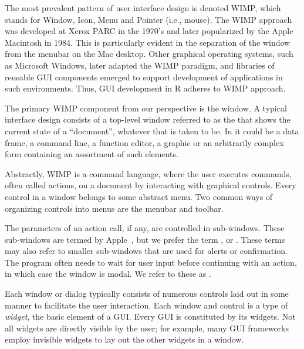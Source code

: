 


The most prevalent pattern of user interface design is denoted WIMP,
which stands for Window, Icon, Menu and Pointer (i.e., mouse). The
WIMP approach was developed at Xerox PARC in the 1970's and later
popularized by the Apple Macintosh in 1984. This is particularly
evident in the separation of the window from the menubar on the Mac
desktop. Other graphical operating systems, such as Microsoft Windows,
later adapted the WIMP paradigm, and libraries of reusable GUI
components emerged to support development of applications in such
environments. Thus, GUI development in R adheres to WIMP approach.

The primary WIMP component from our perspective is the window. A
typical interface design consists of a top-level window referred to as
the  that shows the current state of a
``document'', whatever that is taken to be. In \R\/ it could be a data
frame, a command line, a function editor, a graphic or an arbitrarily
complex form containing an assortment of such elements. 


Abstractly, WIMP is a command language, where the user executes
commands, often called actions, on a document by interacting with
graphical controls. Every control in a window belongs to some abstract
menu. Two common ways of organizing controls into menus are the
menubar and toolbar.

The parameters of an action call, if any, are controlled in
sub-windows. These sub-windows are termed 
by Apple~\citep{APPLE:HIG}, but we prefer the term ,
or . These terms may also refer to smaller
sub-windows that are used for alerts or confirmation. The program
often needs to wait for user input before continuing with an action,
in which case the window is modal. We refer to these as .

Each window or dialog typically consists of numerous controls laid out
in some manner to facilitate the user interaction. Each window and
control is a type of \textit{widget}, the basic element of a
GUI. Every GUI is constituted by its widgets. Not all widgets are
directly visible by the user; for example, many GUI frameworks employ
invisible widgets to lay out the other widgets in a window.

